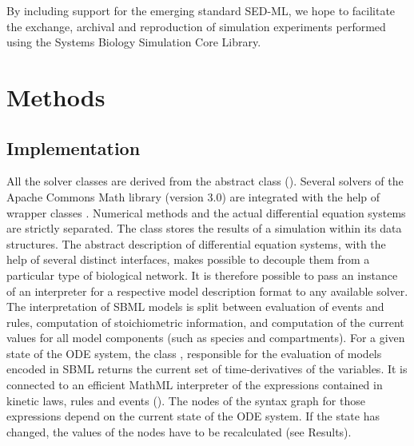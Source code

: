 \documentclass[10pt]{bmc_article}
\newenvironment{bmcformat}{\fussy\setboolean{publ}{true}}{\fussy}
\begin{document}
\begin{bmcformat}
{%

By including support for the emerging standard \acs{SED-ML}, we hope to facilitate the
exchange, archival and reproduction of simulation experiments performed using
the Systems Biology Simulation Core Library.

\section*{Methods}

\subsection*{Implementation}

All the solver classes are derived from the abstract class \AbstractDESSolver ().
Several solvers of the Apache Commons Math library (version 3.0) are integrated with the help of wrapper classes .
Numerical methods and the actual differential equation systems are strictly separated.
The class \MultiTable stores the results of a simulation within its \Block data structures. 
%
The abstract description of differential equation systems, with the help of several distinct interfaces, makes  possible to decouple them from a particular type of biological network. It is therefore possible to pass an instance of an interpreter for a respective model description format to any available solver.
%
The interpretation of \acs{SBML} models is split between evaluation of events and rules,
computation of stoichiometric information, and computation of the current values for all model components (such as species and compartments).
%
For a given state of the \acs{ODE} system, the class \SBMLinterpreter, responsible
for the evaluation of models encoded in \acs{SBML}\COR{,} returns the current set of
time-derivatives of the variables.
It is connected to an efficient MathML interpreter of the expressions contained
in kinetic laws, rules and events (\ASTNodeInterpreter).
The nodes of the syntax graph for those expressions depend on the current state of the \acs{ODE} system.
If the state has changed, the values of the nodes have to be recalculated (see Results).

}
\end{bmcformat}
\end{document}
